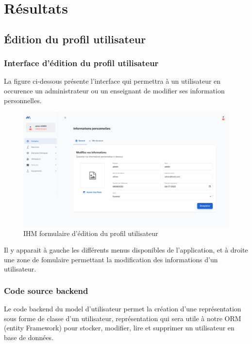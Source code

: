 \newpage
\section{Résultats}

\subsection{Édition du profil utilisateur}

\subsubsection{Interface d'édition du profil utilisateur}

La figure ci-dessous présente l'interface qui permettra à un utilisateur en occurence un administrateur ou un enseignant de modifier ses information personnelles.

\begin{figure}[H]
	\centering
	\includegraphics[width=1\textwidth]{img/editpr}
	\caption{IHM formulaire d'édition du profil utilisateur}
	\label{fig:mesh1}
\end{figure}

Il y apparait à gauche les différents menus disponibles de l'application, et à droite une zone de fomulaire permettant la modification des informations d'un utilisateur.

\subsubsection{Code source backend}

Le code backend du model d'utilisateur permet la création d'une représentation sous forme de classe d'un utilisateur, représentation qui sera utile à notre ORM (entity Framework) pour stocker, modifier, lire et supprimer un utilisateur en base de données.

